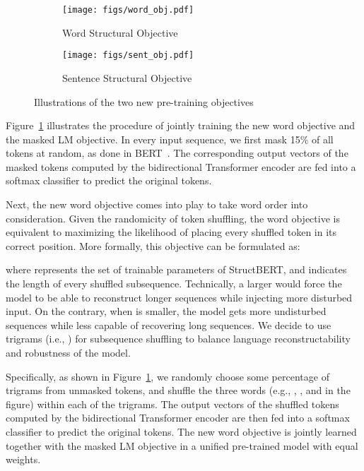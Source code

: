 \documentclass{article}
\begin{document}
\begin{figure}
     \centering
     \begin{subfigure}[b]{0.45\textwidth}
         \centering
         \texttt{[image: figs/word\_obj.pdf]}
         \caption{Word Structural Objective}
         \label{fig:word_obj}
     \end{subfigure}
     \qquad
     \begin{subfigure}[b]{0.45\textwidth}
         \centering
         \texttt{[image: figs/sent\_obj.pdf]}
         \caption{Sentence Structural Objective}
         \label{fig:sent_obj}
     \end{subfigure}
     \caption{Illustrations of the two new pre-training objectives}
     \label{fig:objectives}
\end{figure}

Figure~\ref{fig:word_obj} illustrates the procedure of jointly training the new word objective and the masked LM objective. In every input sequence, we first mask 15\% of all tokens at random, as done in BERT~\cite{devlin2018bert}. The corresponding output vectors  of the masked tokens computed by the bidirectional Transformer encoder are fed into a softmax classifier to predict the original tokens.

Next, the new word objective comes into play to take word order into consideration. Given the randomicity of token shuffling, the word objective is equivalent to maximizing the likelihood of placing every shuffled token in its correct position. More formally, this objective can be formulated as:

where  represents the set of trainable parameters of StructBERT, and  indicates the length of every shuffled subsequence. Technically, a larger  would force the model to be able to reconstruct longer sequences while injecting more disturbed input. On the contrary, when  is smaller, the model gets more undisturbed sequences while less capable of recovering long sequences. We decide to use trigrams (i.e., ) for subsequence shuffling to balance language reconstructability and robustness of the model.

Specifically, as shown in Figure~\ref{fig:word_obj}, we randomly choose some percentage of trigrams from unmasked tokens, and shuffle the three words (e.g., , , and  in the figure) within each of the trigrams. The output vectors of the shuffled tokens computed by the bidirectional Transformer encoder are then fed into a softmax classifier to predict the original tokens. The new word objective is jointly learned together with the masked LM objective in a unified pre-trained model with equal weights.
\end{document}
